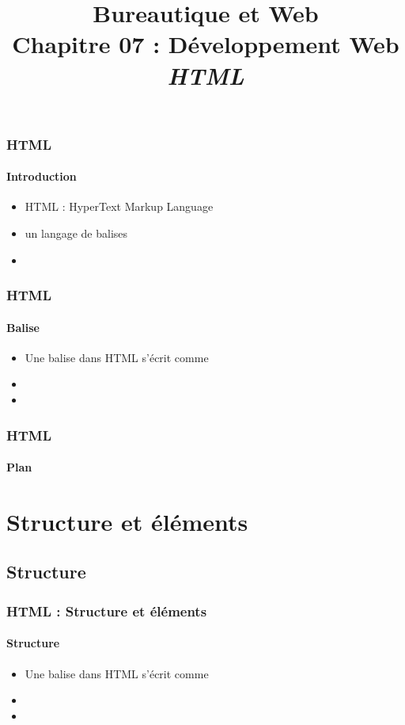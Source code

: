 \documentclass[xcolor=table]{beamer}
\title[BWEB : 07- HTML] %
{Bureautique et Web \\Chapitre 07 : Développement Web\\ \slshape\small  HTML}
\begin{document}
\begin{frame}
\frametitle{HTML}
\framesubtitle{Introduction}

\begin{itemize}
	\item HTML : HyperText Markup Language
	\item un langage de balises  
	\item 
\end{itemize}

\end{frame}

\begin{frame}
\frametitle{HTML}
\framesubtitle{Balise}

\begin{itemize}
	\item Une balise dans HTML s'écrit comme 
	\item   
	\item 
\end{itemize}

\end{frame}


\begin{frame}
\frametitle{HTML}
\framesubtitle{Plan}

\begin{multicols}{2}
\tableofcontents
\end{multicols}
\end{frame}

\section{Structure et éléments}

\subsection{Structure}

\begin{frame}
\frametitle{HTML : Structure et éléments}
\framesubtitle{Structure}

\begin{itemize}
	\item Une balise dans HTML s'écrit comme 
	\item   
	\item 
\end{itemize}

\end{frame}
\end{document}
